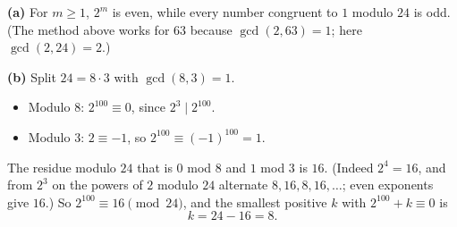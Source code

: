 \textbf{(a)} For $m\ge1$, $2^m$ is even, while every number congruent to $1$ modulo $24$ is odd. (The method above works for $63$ because $\gcd(2,63)=1$; here $\gcd(2,24)=2$.)

\textbf{(b)} Split $24=8\cdot3$ with $\gcd(8,3)=1$.
\begin{itemize}
\item Modulo $8$: $2^{100}\equiv0$, since $2^3\mid2^{100}$.
\item Modulo $3$: $2\equiv-1$, so $2^{100}\equiv(-1)^{100}=1$.
\end{itemize}
The residue modulo $24$ that is $0$ mod $8$ and $1$ mod $3$ is $16$. (Indeed $2^4=16$, and from $2^3$ on the powers of $2$ modulo $24$ alternate $8,16,8,16,\dots$; even exponents give $16$.) So $2^{100}\equiv16\pmod{24}$, and the smallest positive $k$ with $2^{100}+k\equiv0$ is
\[
k=24-16=\boxed{8}.
\]
